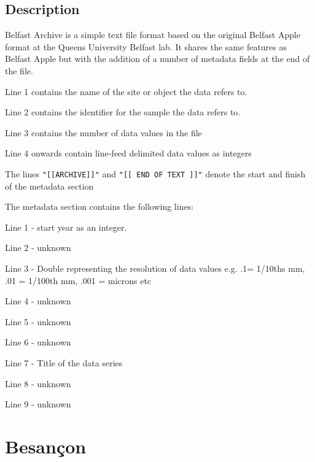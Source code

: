 \documentclass[10pt, headsepline,DIV14,BCOR0.5cm]{scrreprt}
\begin{document}
\section{Description}

Belfast Archive is a simple text file format based on the original Belfast Apple format at the Queens University Belfast lab. It shares the same features as Belfast Apple but with the addition of a number of metadata fields at the end of the file.

\begin{itemize*}
    \item  Line 1 contains the name of the site or object the data refers to.
    \item  Line 2 contains the identifier for the sample the data refers to.
    \item  Line 3 contains the number of data values in the file
    \item  Line 4 onwards contain line-feed delimited data values as integers
    \item  The lines \verb|"[[ARCHIVE]]"| and \verb|"[[ END OF TEXT ]]"| denote the start and finish of the metadata section  
\end{itemize*}

The metadata section contains the following lines:

\begin{itemize*}
    \item  Line 1 - start year as an integer.
    \item  Line 2 - unknown
    \item  Line 3 - Double representing the resolution of data values e.g. .1= 1/10ths mm, .01 = 1/100th mm, .001 = microns etc
    \item  Line 4 - unknown
    \item  Line 5 - unknown
    \item  Line 6 - unknown
    \item  Line 7 - Title of the data series
    \item  Line 8 - unknown
    \item  Line 9 - unknown 
\end{itemize*}

\chapter{Besan\c{c}on}
\end{document}

